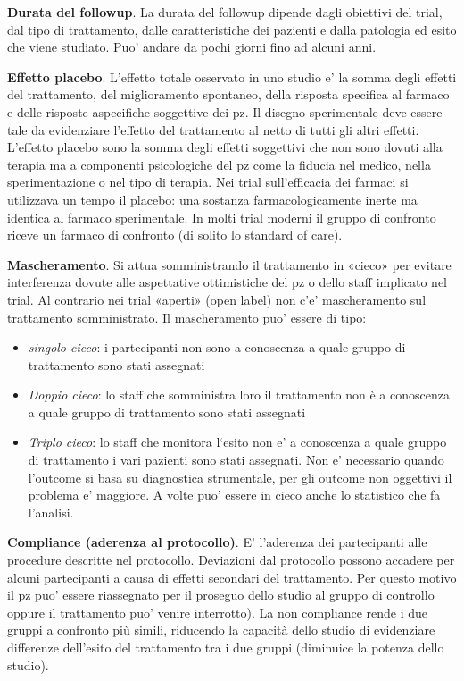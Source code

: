 \documentclass[]{book}
\begin{document}
\textbf{Durata del followup}. La durata del followup dipende dagli obiettivi del trial, dal tipo di trattamento, dalle caratteristiche dei pazienti e dalla patologia ed esito che viene studiato. Puo' andare da pochi giorni fino ad alcuni anni.

\textbf{Effetto placebo}. L'effetto totale osservato in uno studio e' la somma degli effetti del trattamento, del miglioramento spontaneo, della risposta specifica al farmaco e delle risposte aspecifiche soggettive dei pz. Il disegno sperimentale deve essere tale da evidenziare l'effetto del trattamento al netto di tutti gli altri effetti. L'effetto placebo sono la somma degli effetti soggettivi che non sono dovuti alla terapia ma a componenti psicologiche del pz come la fiducia nel medico, nella sperimentazione o nel tipo di terapia. Nei trial sull'efficacia dei farmaci si utilizzava un tempo il placebo: una sostanza farmacologicamente inerte ma identica al farmaco sperimentale. In molti trial moderni il gruppo di confronto riceve un farmaco di confronto (di solito lo standard of care).

\textbf{Mascheramento}. Si attua somministrando il trattamento in «cieco» per evitare interferenza dovute alle aspettative ottimistiche del pz o dello staff implicato nel trial. Al contrario nei trial «aperti» (open label) non c'e' mascheramento sul trattamento somministrato. Il mascheramento puo' essere di tipo:

\begin{itemize}
\item
  \emph{singolo cieco}: i partecipanti non sono a conoscenza a quale gruppo di trattamento sono stati assegnati
\item
  \emph{Doppio cieco}: lo staff che somministra loro il trattamento non è a conoscenza a quale gruppo di trattamento sono stati assegnati
\item
  \emph{Triplo cieco}: lo staff che monitora l`esito non e' a conoscenza a quale gruppo di trattamento i vari pazienti sono stati assegnati. Non e' necessario quando l'outcome si basa su diagnostica strumentale, per gli outcome non oggettivi il problema e' maggiore. A volte puo' essere in cieco anche lo statistico che fa l'analisi.
\end{itemize}

\textbf{Compliance (aderenza al protocollo)}. E' l'aderenza dei partecipanti alle procedure descritte nel protocollo.
Deviazioni dal protocollo possono accadere per alcuni partecipanti a causa di effetti secondari del trattamento. Per questo motivo il pz puo' essere riassegnato per il proseguo dello studio al gruppo di controllo oppure il trattamento puo' venire interrotto). La non compliance rende i due gruppi a confronto più simili, riducendo la capacità dello studio di evidenziare differenze dell'esito del trattamento tra i due gruppi (diminuice la potenza dello studio).
\end{document}
